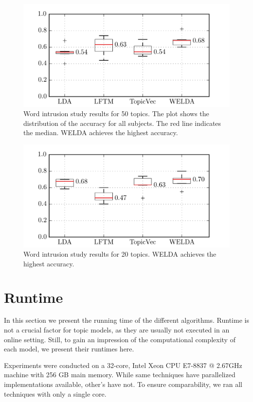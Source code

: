 \documentclass[
        a4paper,
        titlepage,
        twoside,
        parskip,
        numbers=noenddot
        ]{scrbook}
\theoremstyle{break}
\begin{document}
\begin{figure}
       \centering
       \includegraphics[width=12cm]{figures/word_intrusion_50.png}
       \caption{Word intrusion study results for 50 topics. The plot shows the distribution of the accuracy for all subjects. The red line indicates the median. WELDA achieves the highest accuracy.}
       \label{fig:word_intrusion_50}
\end{figure}

\begin{figure}
       \centering
       \includegraphics[width=12cm]{figures/word_intrusion_20.png}
       \caption{Word intrusion study results for 20 topics. WELDA achieves the highest accuracy.}
       \label{fig:word_intrusion_20}
\end{figure}

\section{Runtime}
\label{sec:runtime}

In this section we present the running time of the different algorithms.
Runtime is not a crucial factor for topic models, as they are usually not executed in an online setting.
Still, to gain an impression of the computational complexity of each model, we present their runtimes here.

Experiments were conducted on a 32-core, Intel Xeon CPU E7-8837 @ 2.67GHz machine with 256 GB main memory.
While same techniques have parallelized implementations available, other's have not.
To ensure comparability, we ran all techniques with only a single core.
\end{document}

